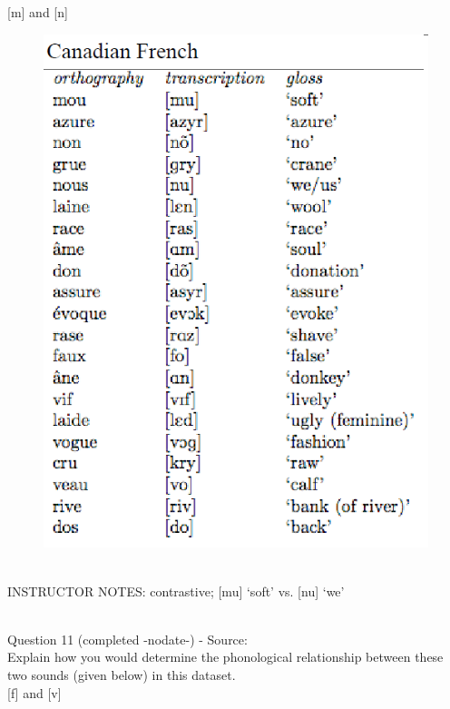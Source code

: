 \documentclass[12pt]{article}
\begin{document}
{[m]} and {[n]}

\begin{figure}[H]
\includegraphics{../images/canadianfrench.png}
\end{figure}

~\\
INSTRUCTOR NOTES: contrastive; [mu] ‘soft’ vs. [nu] ‘we’


~\\

{\large Question 11} (completed -nodate-) - Source: \\

Explain how you would determine the phonological relationship between these two sounds (given below) in this dataset.\\

{[f]} and {[v]}
\end{document}
